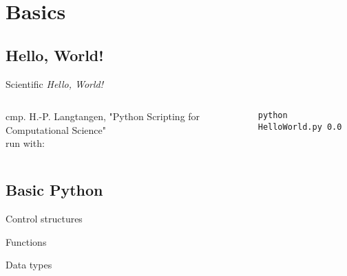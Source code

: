 \section{Basics}

\subsection{Hello, World!}

\begin{frame}[fragile]{Scientific \emph{Hello, World!}}

\begin{columns}





cmp. H.-P. Langtangen, "Python Scripting for Computational Science"\\[1ex]

run with:
\begin{verbatim}
python HelloWorld.py 0.0
\end{verbatim}

\end{columns}

\end{frame}


\subsection{Basic Python}

\begin{frame}[fragile]{Control structures}



\end{frame}

\begin{frame}[fragile]{Functions}



\end{frame}


\begin{frame}[fragile]{Data types}



\end{frame}


